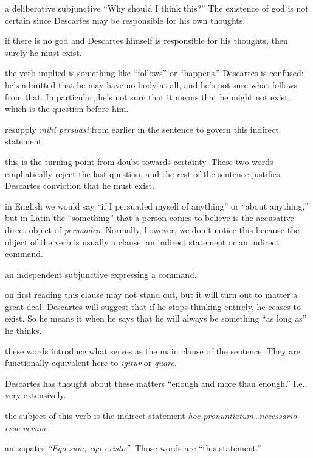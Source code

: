  a deliberative subjunctive ``Why should I think this?'' The existence of god is not certain since Descartes may be responsible for his own thoughts.

 if there is no god and Descartes himself is responsible for his thoughts, then surely he must exist.

 the verb implied is something like ``follows'' or ``happens.'' Descartes is confused: he's admitted that he may have no body at all, and he's not sure what follows from that. In particular, he's not sure that it means that he might not exist, which is the question before him.

 resupply \textit{mihi persuasi} from earlier in the sentence to govern this indirect statement.

 this is the turning point from doubt towards certainty. These two words emphatically reject the last question, and the rest of the sentence justifies Descartes conviction that he must exist.

 in English we would say ``if I persuaded myself of anything'' or ``about anything,'' but in Latin the ``something'' that a person comes to believe is the accusative direct object of \textit{persuadeo}. Normally, however, we don't notice this because the object of the verb is usually a clause: an indirect statement or an indirect command.

 an independent subjunctive expressing a command.

 on first reading this clause may not stand out, but it will turn out to matter a great deal. Descartes will suggest that if he stops thinking entirely, he ceases to exist. So he means it when he says that he will always be something ``as long as'' he thinks.

 these words introduce what serves as the main clause of the sentence. They are functionally equivalent here to \textit{igitur} or \textit{quare}.

 Descartes has thought about these matters ``enough and more than enough.'' I.e., very extensively.

 the subject of this verb is the indirect statement \textit{hoc pronuntiatum\dots necessario esse verum}.

 anticipates \textit{``Ego sum, ego existo''}. Those words are ``this statement.''

